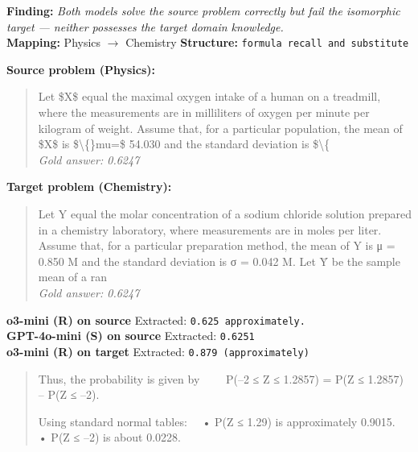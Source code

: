 \begin{tcolorbox}[
  colback=gray!5, colframe=gray!40,
  title={\textbf{Example 2: Pure Knowledge Bottleneck}},
  fonttitle=\small\bfseries, breakable]

\textbf{Finding:} \textit{Both models solve the source problem correctly but fail the isomorphic target — neither possesses the target domain knowledge.}
\\[4pt]
\textbf{Mapping:} Physics $\to$ Chemistry \quad
\textbf{Structure:} \texttt{formula recall and substitute}

\vspace{6pt}
\textbf{Source problem (Physics):}\\
\begin{quote}\small Let \$X\$ equal the maximal oxygen intake of a human on a treadmill, where the measurements are in milliliters of oxygen per minute per kilogram of weight. Assume that, for a particular population, the mean of \$X\$ is \$\textbackslash\{\}mu=\$ 54.030 and the standard deviation is \$\textbackslash\{\\
\textit{Gold answer: 0.6247}\end{quote}

\textbf{Target problem (Chemistry):}\\
\begin{quote}\small Let Y equal the molar concentration of a sodium chloride solution prepared in a chemistry laboratory, where measurements are in moles per liter. Assume that, for a particular preparation method, the mean of Y is μ = 0.850 M and the standard deviation is σ = 0.042 M. Let Ȳ be the sample mean of a ran\\
\textit{Gold answer: 0.6247}\end{quote}

\vspace{4pt}
\textbf{o3-mini (R) on source} \textcolor{darkgreen}{\cmark} Extracted: \texttt{0.625 approximately.}
\\[-2pt]
\textbf{GPT-4o-mini (S) on source} \textcolor{darkgreen}{\cmark} Extracted: \texttt{0.6251}
\\[-2pt]
\textbf{o3-mini (R) on target} \textcolor{red}{\xmark} Extracted: \texttt{0.879 (approximately)}
\begin{quote}\scriptsize\ttfamily [...] 
Thus, the probability is given by
  P(–2 ≤ Z ≤ 1.2857) = P(Z ≤ 1.2857) – P(Z ≤ –2).

Using standard normal tables:
 • P(Z ≤ 1.29) is approximately 0.9015.
 • P(Z ≤ –2) is about 0.0228.


\end{quote}
\end{tcolorbox}
